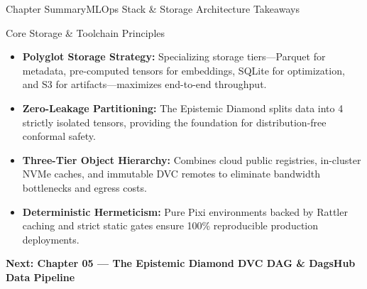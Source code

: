 \begin{frame}{Chapter Summary}{MLOps Stack \& Storage Architecture Takeaways}
    \begin{block}{Core Storage \& Toolchain Principles}
        \begin{itemize}\small
            \item \textbf{Polyglot Storage Strategy:} Specializing storage tiers---Parquet for metadata, pre-computed tensors for embeddings, SQLite for optimization, and S3 for artifacts---maximizes end-to-end throughput.
            \item \textbf{Zero-Leakage Partitioning:} The Epistemic Diamond splits data into 4 strictly isolated tensors, providing the foundation for distribution-free conformal safety.
            \item \textbf{Three-Tier Object Hierarchy:} Combines cloud public registries, in-cluster NVMe caches, and immutable DVC remotes to eliminate bandwidth bottlenecks and egress costs.
            \item \textbf{Deterministic Hermeticism:} Pure Pixi environments backed by Rattler caching and strict static gates ensure 100\% reproducible production deployments.
        \end{itemize}
    \end{block}

    \vspace{0.2cm}
    \begin{center}
        \textcolor{deepblue}{\textbf{Next: Chapter 05 --- The Epistemic Diamond DVC DAG \& DagsHub Data Pipeline}}
    \end{center}

\end{frame}
